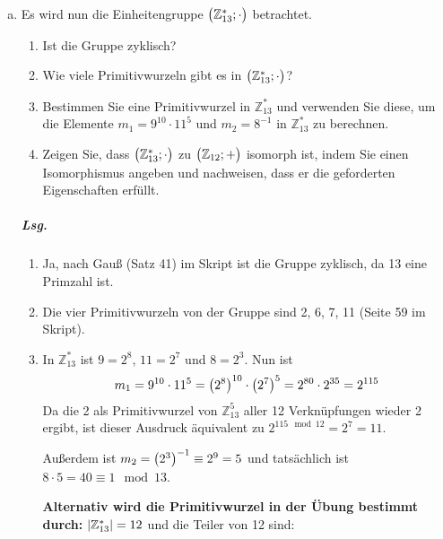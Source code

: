 \documentclass{scrreprt}
\begin{document}
\begin{enumerate}[(a)]
\begin{enumerate}[(1)]
  \end{enumerate}
\item Es wird nun die Einheitengruppe $\qty\big(\mathbb{Z}_{13}^*; \cdot)$
  betrachtet.
  \begin{enumerate}[(1)]
  \item Ist die Gruppe zyklisch?
  \item Wie viele Primitivwurzeln gibt es in
    $\qty\big(\mathbb{Z}_{13}^*; \cdot)$?
  \item Bestimmen Sie eine Primitivwurzel in $\mathbb{Z}_{13}^*$ und verwenden
    Sie diese, um die Elemente $m_1 = 9^{10} \cdot 11^{5}$ und $m_2 = 8^{-1}$ in
    $\mathbb{Z}_{13}^*$ zu berechnen.
  \item Zeigen Sie, dass $\qty\big(\mathbb{Z}_{13}^*; \cdot)$ zu
    $\qty\big(\mathbb{Z}_{12}; +)$ isomorph ist, indem Sie einen Isomorphismus
    angeben und nachweisen, dass er die geforderten Eigenschaften erfüllt.
  \end{enumerate}

  \subparagraph{Lsg.}
  \begin{enumerate}[(1)]
  \item Ja, nach Gauß (Satz 41) im Skript ist die Gruppe zyklisch, da 13 eine
    Primzahl ist.
  \item Die vier Primitivwurzeln von der Gruppe sind 2, 6, 7, 11
    (Seite 59 im Skript).

  \newpage
  \item In $\mathbb{Z}_{13}^*$ ist $9 = 2^8$, $11 = 2^7$ und $8 = 2^3$.
    Nun ist
    \[
      m_1 = 9^{10} \cdot 11^5 =\qty(2^8)^{10} \cdot \qty(2^7)^5
      = 2^{80} \cdot 2^{35} = 2^{115}
    \]
    Da die 2 als Primitivwurzel von $\mathbb{Z}_{13}^5$ aller 12
    Verknüpfungen wieder 2 ergibt, ist dieser Ausdruck äquivalent zu
    $2^{115 \mod 12} = 2^{7} = 11$.

    Außerdem ist $m_2 = \qty\big(2^3)^{-1} \equiv 2^9 = 5$ und tatsächlich ist
    $8 \cdot 5 = 40 \equiv 1 \mod 13$.

    \textbf{Alternativ wird die Primitivwurzel in der Übung bestimmt durch:}
    $\abs{\mathbb{Z}_{13}^*} = 12$ und die Teiler von 12 sind:



\end{enumerate}
\end{enumerate}
\end{document}
